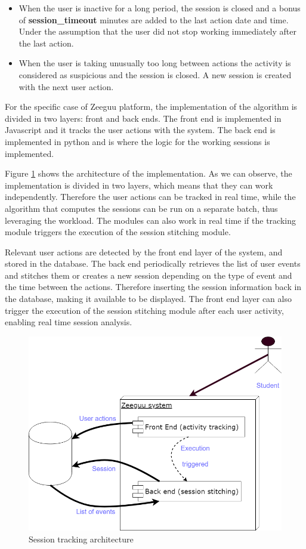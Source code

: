 \begin{itemize}
	\item When the user is inactive for a long period, the session is closed and a bonus of \textbf{session\_timeout} minutes are added to the last action date and time. Under the assumption that the user did not stop working immediately after the last action.
	
	\item When the user is taking unusually too long between actions the activity is considered as suspicious and the session is closed. A new session is created with the next user action.
\end{itemize}

For the specific case of Zeeguu platform, the implementation of the algorithm is divided in two layers: front and back ends. The front end is implemented in Javascript and it tracks the user actions with the system. The back end is implemented in python and is where the logic for the working sessions is implemented.

Figure \ref{fig:session_tracking_architecture} shows the architecture of the implementation. As we can observe, the implementation is divided in two layers, which means that they can work independently. Therefore the user actions can be tracked in real time, while the algorithm that computes the sessions can be run on a separate batch, thus leveraging the workload. The modules can also work in real time if the tracking module triggers the execution of the session stitching module.

Relevant user actions are detected by the front end layer of the system, and stored in the database. The back end periodically retrieves the list of user events and stitches them or creates a new session depending on the type of event and the time between the actions. Therefore inserting the session information back in the database, making it available to be displayed.
The front end layer can also trigger the execution of the session stitching module after each user activity, enabling real time session analysis.

\begin{figure}[bth]
	\centering
	\includegraphics[width=0.7\linewidth]{gfx/session_tracking_architecture}
	\caption{Session tracking architecture}\label{fig:session_tracking_architecture}
\end{figure}

